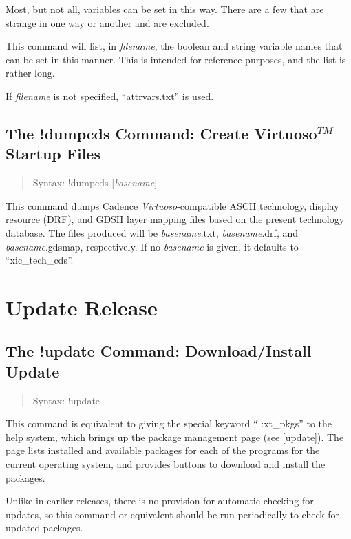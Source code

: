 Most, but not all, variables can be set in this way.  There are a few
that are strange in one way or another and are excluded.

This command will list, in {\it filename\/}, the boolean and string
variable names that can be set in this manner.  This is intended for
reference purposes, and the list is rather long.

If {\it filename} is not specified, ``{\vt attrvars.txt}'' is used.

\subsection{The {\cb !dumpcds} Command: Create Virtuoso$^{TM}$ Startup Files}
\begin{quote}
Syntax: {\vt !dumpcds} [{\it basename\/}]
\end{quote}
This command dumps Cadence {\it Virtuoso\/}-compatible ASCII
technology, display resource (DRF), and GDSII layer mapping files
based on the present {\Xic} technology database.  The files produced
will be {\it basename\/}{\vt .txt}, {\it basename\/}{\vt .drf}, and
{\it basename\/}{\vt .gdsmap}, respectively.  If no {\it basename} is
given, it defaults to ``{\vt xic\_tech\_cds}''.


\section{Update Release}

\subsection{The {\cb !update} Command: Download/Install Update}
\begin{quote}
Syntax: {\vt !update}
\end{quote}
This command is equivalent to giving the special keyword ``{\vt
:xt\_pkgs}'' to the help system, which brings up the {\XicTools}
package management page (see \ref{update}).  The page lists installed
and available packages for each of the {\XicTools} programs for the
current operating system, and provides buttons to download and install
the packages.
 
Unlike in earlier {\Xic} releases, there is no provision for automatic
checking for updates, so this command or equivalent should be run
periodically to check for updated packages.

